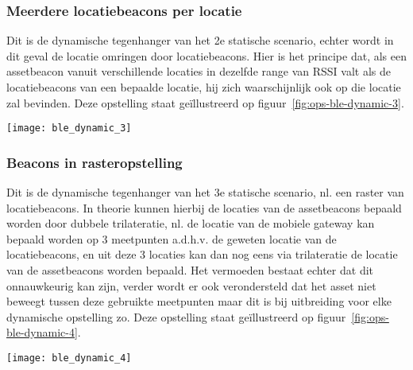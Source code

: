 \subsubsection{Meerdere locatiebeacons per locatie}
\begin{minipage}{0.65\textwidth}
Dit is de dynamische tegenhanger van het 2e statische scenario, echter wordt in dit geval de locatie omringen door locatiebeacons. Hier is het principe dat, als een assetbeacon vanuit verschillende locaties in dezelfde range van RSSI valt als de locatiebeacons van een bepaalde locatie, hij zich waarschijnlijk ook op die locatie zal bevinden. Deze opstelling staat geïllustreerd op figuur~\ref{fig:ops-ble-dynamic-3}.
\end{minipage}
\hfill
\begin{minipage}{0.30\textwidth}
	\texttt{[image: ble\_dynamic\_3]}
	\label{fig:ops-ble-dynamic-3}
\end{minipage}

\subsubsection{Beacons in rasteropstelling}
\begin{minipage}{0.65\textwidth}
Dit is de dynamische tegenhanger van het 3e statische scenario, nl. een raster van locatiebeacons. In theorie kunnen hierbij de locaties van de assetbeacons bepaald worden door dubbele trilateratie, nl. de locatie van de mobiele gateway kan bepaald worden op 3 meetpunten a.d.h.v. de geweten locatie van de locatiebeacons, en uit deze 3 locaties kan dan nog eens via trilateratie de locatie van de assetbeacons worden bepaald. Het vermoeden bestaat echter dat dit onnauwkeurig kan zijn, verder wordt er ook verondersteld dat het asset niet beweegt tussen deze gebruikte meetpunten maar dit is bij uitbreiding voor elke dynamische opstelling zo. Deze opstelling staat geïllustreerd op figuur~\ref{fig:ops-ble-dynamic-4}.
\end{minipage}
\hfill
\begin{minipage}{0.30\textwidth}
	\texttt{[image: ble\_dynamic\_4]}
	\label{fig:ops-ble-dynamic-4}
\end{minipage}

